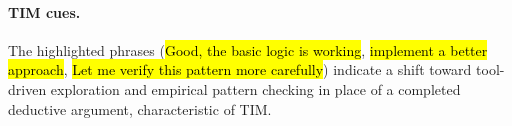 \documentclass[11pt]{article}
\def \task{\textsc{TIM}\xspace}
\begin{document}
\begin{example}[title=Example 3. Claude-opus-4]
\paragraph{\task{} cues.}
The highlighted phrases (\hl{Good, the basic logic is working}, \hl{implement a better approach}, \hl{Let me verify this pattern more carefully}) indicate a shift toward tool-driven exploration and empirical pattern checking in place of a completed deductive argument, characteristic of \task{}.

\end{example}



 

\end{document}
